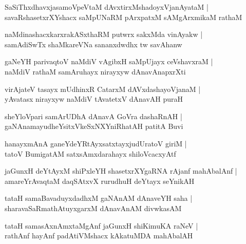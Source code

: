 \documentclass[twoside,12pt,openright]{book}
\newcounter{shloka}[chapter]
\begin{document}
\begin{shloka}%
SaSiThxdhavxjasamoVpeVtaM dAvxtirxMshadoyxVjanAyataM |\\
savaRshasetxrXYshacx saMpUNaRM pArxpatxM sAMgArxmikaM rathaM 
\end{shloka}

\begin{shloka}%
naMdinashacxkarxrakASxthaRM putwrx sakxMda vinAyakw |\\
samAdiSwTx shaMkareVNa sananxdwdhx tw savAhanw
\end{shloka}

\begin{shloka}%
gaNeYH parivaqtoV naMdiV vAgibxH saMpUjayx ceVshavxraM |\\
naMdiV rathaM samAruhayx nirayxyw dAnavAnapxrXti
\end{shloka}

\begin{shloka}%
virAjateV tasayx mUdhinxR CatarxM dAVxdashayoVjanaM |\\
yAvatasx nirayxyw naMdiV tAvatetxV dAnavAH puraH 
\end{shloka}

\begin{shloka}%
sheYloVpari samArUDhA dAnavA GoVra dashaRnAH |\\
gaNAnamayudheYsitxVkeSxNXYniRhatAH patitA Buvi 
\end{shloka}

\begin{shloka}%
hanayxmAnA ganeYdeYRtAyxsatxtayxjudUratoV giriM |\\
tatoV BumigatAM satxsAmxdarahayx shiloVcacxyAtf 
\end{shloka}

\begin{shloka}%
jaGunxH deYtAyxM shiPxleYH shasetxrXYgaRNA rAjanf mahAbalAnf |\\
amareYrAvaqtaM daqSAtxvX rurudhuH deYtayx seYnikAH 
\end{shloka}

\begin{shloka}%
tataH samaBavaduyxdadhxM gaNAnAM dAnaveYH saha |\\
sharavaSaRmathAtuyxgarxM dAnavAnAM divwkasAM 
\end{shloka}

\begin{shloka}%
tataH samasAxnAmxtaMgAnf jaGunxH shiKimuKA raNeV |\\
rathAnf hayAnf padAtiVMshacx kAkatuMDA mahAbalAH  
\end{shloka}
\end{document}
